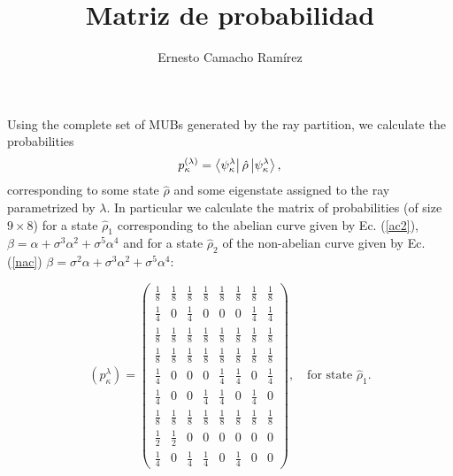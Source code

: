 \documentclass[a4paper]{article}
\title{Matriz de probabilidad}
\author{Ernesto Camacho Ramírez}
\begin{document}
  \maketitle

  Using the complete set of MUBs generated by the ray
  partition, we calculate the probabilities
  \begin{equation}
    p_\kappa^{(\lambda)}
    = \bra{\psi_{\kappa}^{\lambda}}
    \hat\rho
    \ket{\psi_{\kappa}^{\lambda}},
  \end{equation}
  corresponding to some state $\hat\rho$ and some eigenstate
  assigned to the ray parametrized by $\lambda$. In
  particular we calculate the matrix of probabilities (of
  size $9 \times 8$) for a state $\hat\rho_1$ corresponding
  to the abelian curve given by Ec.  (\ref{ac2}), $\beta =
  \alpha + \sigma^3 \alpha^2 + \sigma^{5} \alpha^{4}$ and
  for a state $\hat\rho_2$ of the non-abelian curve given by
  Ec.  (\ref{nac}) $\beta = \sigma^2 \alpha + \sigma^3
  \alpha^2 + \sigma^{5} \alpha^{4}$:

  \begin{equation}
    \left( p_\kappa^\lambda \right) =
    \displaystyle \left(\begin{array}{rrrrrrrr}
    \frac{1}{8} & \frac{1}{8} & \frac{1}{8} & \frac{1}{8} &
    \frac{1}{8} & \frac{1}{8} & \frac{1}{8} & \frac{1}{8} \\
    [6pt]
    \frac{1}{4} & 0 & \frac{1}{4} & 0 & 0 & 0 & \frac{1}{4}
                & \frac{1}{4} \\ [6pt]
    \frac{1}{8} & \frac{1}{8} & \frac{1}{8} & \frac{1}{8} &
    \frac{1}{8} & \frac{1}{8} & \frac{1}{8} & \frac{1}{8} \\
    [6pt]
    \frac{1}{8} & \frac{1}{8} & \frac{1}{8} & \frac{1}{8} &
    \frac{1}{8} & \frac{1}{8} & \frac{1}{8} & \frac{1}{8} \\
    [6pt]
    \frac{1}{4} & 0 & 0 & 0 & \frac{1}{4} & \frac{1}{4} & 0
                & \frac{1}{4} \\ [6pt]
    \frac{1}{4} & 0 & 0 & \frac{1}{4} & \frac{1}{4} & 0 &
    \frac{1}{4} & 0 \\ [6pt]
    \frac{1}{8} & \frac{1}{8} & \frac{1}{8} & \frac{1}{8} &
    \frac{1}{8} & \frac{1}{8} & \frac{1}{8} & \frac{1}{8} \\
    [6pt]
    \frac{1}{2} & \frac{1}{2} & 0 & 0 & 0 & 0 & 0 & 0 \\
    [6pt]
    \frac{1}{4} & 0 & \frac{1}{4} & \frac{1}{4} & 0 &
    \frac{1}{4} & 0 & 0
    \end{array}\right),
    \quad
    \text{for state } \hat\rho_1.
  \end{equation}
\end{document}
